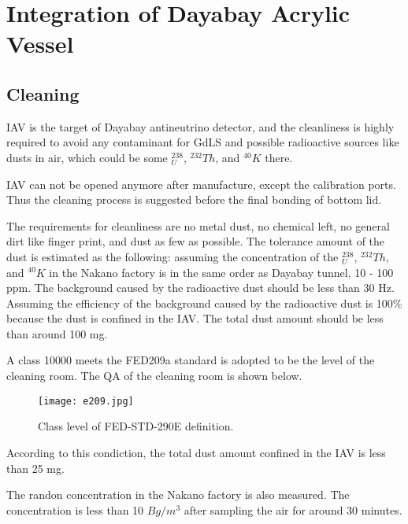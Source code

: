 
\section {Integration of Dayabay Acrylic Vessel}
\subsection {Cleaning}

IAV is the target of Dayabay antineutrino detector,
and the cleanliness is highly required to avoid any contaminant
for GdLS and possible radioactive sources like dusts in air, which
could be some $^{238}_U$, $^{232}Th$, and $^{40}K$ there.

IAV can not be opened anymore after manufacture, except the calibration ports.
Thus the cleaning process is suggested before the final bonding of bottom lid.


The requirements for cleanliness are no metal dust, no chemical left,
no general dirt like finger print, and dust as few as possible.
The tolerance amount of the dust is estimated as the following:
assuming the concentration of the $^238_U$, $^232Th$, and $^40K$
in the Nakano factory is in the same order as Dayabay tunnel, 10 - 100 ppm.
The background caused by the radioactive dust should be less than 30 Hz.
Assuming the efficiency of the background caused by the radioactive dust is 100\% because
the dust is confined in the IAV. The total dust amount should be less than around 100 mg.




A class 10000 meets the FED209a standard is adopted to be the level of the cleaning room.
The QA of the cleaning room is shown below.


\begin{figure}
    \centering
    \texttt{[image: e209.jpg]}
    \caption{Class level of FED-STD-290E definition.}
    \label{e209.jpg}
    \end{figure}


According to this condiction, the total dust amount confined in the IAV is less
than 25 mg.


The randon concentration in the Nakano factory is also measured. The concentration
is less than 10 $Bg/m^3$ after sampling the air for around 30 minutes.

